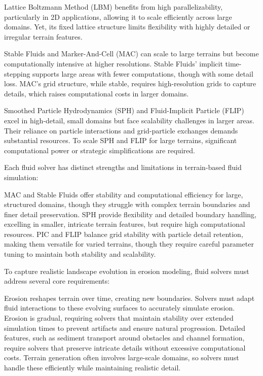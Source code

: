 Lattice Boltzmann Method (LBM) benefits from high parallelizability, particularly in 2D applications, allowing it to scale efficiently across large domains. Yet, its fixed lattice structure limits flexibility with highly detailed or irregular terrain features.

Stable Fluids and Marker-And-Cell (MAC) can scale to large terrains but become computationally intensive at higher resolutions. Stable Fluids' implicit time-stepping supports large areas with fewer computations, though with some detail loss. MAC's grid structure, while stable, requires high-resolution grids to capture details, which raises computational costs in larger domains.

Smoothed Particle Hydrodynamics (SPH) and Fluid-Implicit Particle (FLIP) excel in high-detail, small domains but face scalability challenges in larger areas. Their reliance on particle interactions and grid-particle exchanges demands substantial resources. To scale SPH and FLIP for large terrains, significant computational power or strategic simplifications are required.

\smallConclusion

Each fluid solver has distinct strengths and limitations in terrain-based fluid simulation:

\begin{Itemize}
     MAC and Stable Fluids offer stability and computational efficiency for large, structured domains, though they struggle with complex terrain boundaries and finer detail preservation.
     SPH provide flexibility and detailed boundary handling, excelling in smaller, intricate terrain features, but require high computational resources.
     PIC and FLIP balance grid stability with particle detail retention, making them versatile for varied terrains, though they require careful parameter tuning to maintain both stability and scalability.
\end{Itemize}

\midConclusion

To capture realistic landscape evolution in erosion modeling, fluid solvers must address several core requirements:

\begin{Itemize}
     Erosion reshapes terrain over time, creating new boundaries. Solvers must adapt fluid interactions to these evolving surfaces to accurately simulate erosion.
     Erosion is gradual, requiring solvers that maintain stability over extended simulation times to prevent artifacts and ensure natural progression.
     Detailed features, such as sediment transport around obstacles and channel formation, require solvers that preserve intricate details without excessive computational costs.
     Terrain generation often involves large-scale domains, so solvers must handle these efficiently while maintaining realistic detail.
\end{Itemize}



